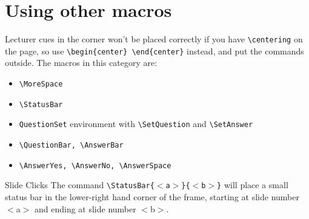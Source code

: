 \documentclass[10pt]{beamer}
\begin{document}
\section{Using other macros}
\frame{\tableofcontents[currentsection]}
\begin{frame}[t,fragile]
Lecturer cues in the corner won't be placed correctly if you have \verb|\centering| on the page, so use \verb|\begin{center} \end{center}| instead, and put the commands outside.
\vfill
The macros in this category are:
\begin{itemize}
\item \verb|\MoreSpace|
\item \verb|\StatusBar|
\item \texttt{QuestionSet} environment with \verb|\SetQuestion| and \verb|\SetAnswer| 
\item \verb|\QuestionBar, \AnswerBar|
\item \verb|\AnswerYes, \AnswerNo, \AnswerSpace|
\end{itemize}
\end{frame}
\begin{frame}[t]{Slide Clicks}
The command \texttt{\textbackslash StatusBar\{$<$a$>$\}\{$<$b$>$\}} will place a small status bar in the lower-right hand corner of the frame, starting at slide number $<$a$>$ and ending at slide number $<$b$>$.\vfill
{}
\end{frame}
\end{document}
